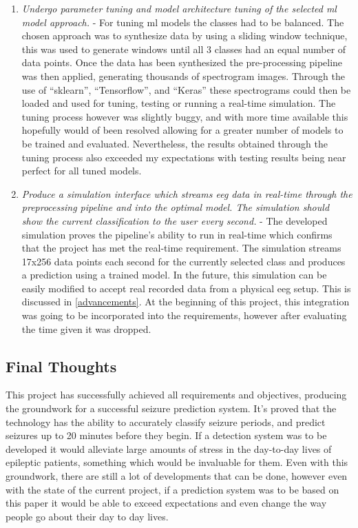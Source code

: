 \documentclass[12pt]{article}
\begin{document}
\begin{enumerate}
        
\item \textit{Undergo parameter tuning and model architecture tuning of the selected \acrshort{ml} model approach.} - For tuning \acrshort{ml} models the classes had to be balanced. The chosen approach was to synthesize data by using a sliding window technique, this was used to generate windows until all 3 classes had an equal number of data points. Once the data has been synthesized the pre-processing pipeline was then applied, generating thousands of spectrogram images. Through the use of ``sklearn'', ``Tensorflow'', and ``Keras'' these spectrograms could then be loaded and used for tuning, testing or running a real-time simulation. The tuning process however was slightly buggy, and with more time available this hopefully would of been resolved allowing for a greater number of models to be trained and evaluated. Nevertheless, the results obtained through the tuning process also exceeded my expectations with testing results being near perfect for all tuned models.
        
        
\item \textit{Produce a simulation interface which streams \acrshort{eeg} data in real-time through the preprocessing pipeline and into the optimal model. The simulation should show the current classification to the user every second.} - The developed simulation proves the pipeline's ability to run in real-time which confirms that the project has met the real-time requirement. The simulation streams 17x256 data points each second for the currently selected class and produces a prediction using a trained model. In the future, this simulation can be easily modified to accept real recorded data from a physical \acrshort{eeg} setup. This is discussed in \ref{advancements}. At the beginning of this project, this integration was going to be incorporated into the requirements, however after evaluating the time given it was dropped.
\end{enumerate}

\subsection{Final Thoughts}

This project has successfully achieved all requirements and objectives, producing the groundwork for a successful seizure prediction system. It's proved that the technology has the ability to accurately classify seizure periods, and predict seizures up to 20 minutes before they begin. If a detection system was to be developed it would alleviate large amounts of stress in the day-to-day lives of epileptic patients, something which would be invaluable for them. Even with this groundwork, there are still a lot of developments that can be done, however even with the state of the current project, if a prediction system was to be based on this paper it would be able to exceed expectations and even change the way people go about their day to day lives.
\end{document}
